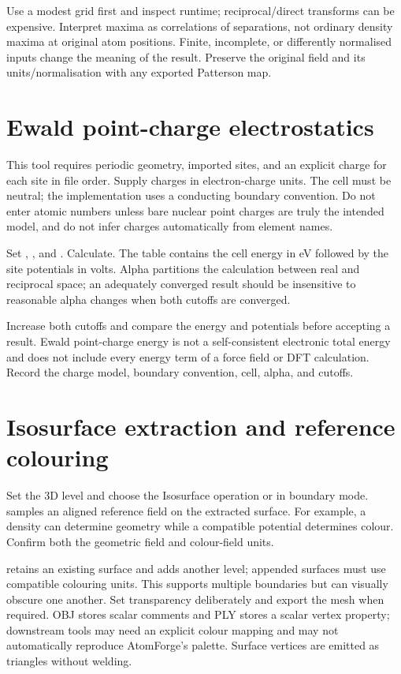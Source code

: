 Use a modest grid first and inspect runtime; reciprocal/direct transforms can be expensive. Interpret maxima as correlations of separations, not ordinary density maxima at original atom positions. Finite, incomplete, or differently normalised inputs change the meaning of the result. Preserve the original field and its units/normalisation with any exported Patterson map.

\section{Ewald point-charge electrostatics}
This tool requires periodic geometry, imported sites, and an explicit charge for each site in file order. Supply charges in electron-charge units. The cell must be neutral; the implementation uses a conducting boundary convention. Do not enter atomic numbers unless bare nuclear point charges are truly the intended model, and do not infer charges automatically from element names.

Set , , and . Calculate. The table contains the cell energy in eV followed by the site potentials in volts. Alpha partitions the calculation between real and reciprocal space; an adequately converged result should be insensitive to reasonable alpha changes when both cutoffs are converged.

Increase both cutoffs and compare the energy and potentials before accepting a result. Ewald point-charge energy is not a self-consistent electronic total energy and does not include every energy term of a force field or DFT calculation. Record the charge model, boundary convention, cell, alpha, and cutoffs.

\section{Isosurface extraction and reference colouring}
Set the 3D level and choose the Isosurface operation or  in boundary mode.  samples an aligned reference field on the extracted surface. For example, a density can determine geometry while a compatible potential determines colour. Confirm both the geometric field and colour-field units.

 retains an existing surface and adds another level; appended surfaces must use compatible colouring units. This supports multiple boundaries but can visually obscure one another. Set transparency deliberately and export the mesh when required. OBJ stores scalar comments and PLY stores a scalar vertex property; downstream tools may need an explicit colour mapping and may not automatically reproduce AtomForge's palette. Surface vertices are emitted as triangles without welding.

